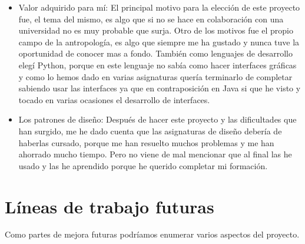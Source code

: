 \begin{itemize}
\item Valor adquirido para mí: 
El principal motivo para la elección de este proyecto fue, el tema del mismo, es algo que si no se hace en colaboración con una universidad no es muy probable que surja. Otro de los motivos fue el propio campo de la antropología, es algo que siempre me ha gustado y nunca tuve la oportunidad de conocer mas a fondo.
También como lenguajes de desarrollo elegí Python, porque en este lenguaje no sabía como hacer interfaces gráficas y como lo hemos dado en varias asignaturas quería terminarlo de completar sabiendo usar las interfaces ya que en contraposición en Java si que he visto y tocado en varias ocasiones el desarrollo de interfaces.

\item Los patrones de diseño:
Después de hacer este proyecto y las dificultades que han surgido, me he dado cuenta que las asignaturas de diseño debería de haberlas cursado, porque me han resuelto muchos problemas y me han ahorrado mucho tiempo.
Pero no viene de mal mencionar que al final las he usado y las he aprendido porque he querido completar mi formación.

\end{itemize}



\section{Líneas de trabajo futuras}
Como partes de mejora futuras podríamos enumerar varios aspectos del proyecto.

